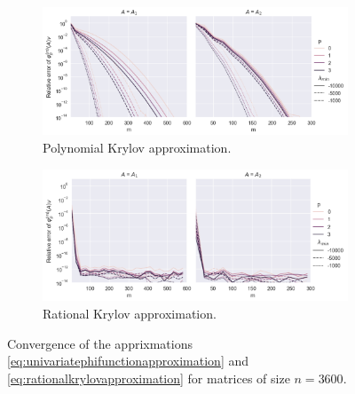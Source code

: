 \begin{figure}[h!]
    \centering
    \begin{subfigure}[b]{.9\textwidth}
        \includegraphics[width=\textwidth]{img/krylovapproximation/cnvg_ps_PA_3600.png}
        \caption{Polynomial Krylov approximation.}
        \label{fig:polynomialkrylovapproximationevaluation}
    \end{subfigure}
    \vfill
    \begin{subfigure}[b]{.9\textwidth}
        \includegraphics[width=\textwidth]{img/krylovapproximation/cnvg_ps_RA_3600.png}
        \caption{Rational Krylov approximation.}
        \label{fig:rationalkrylovapproximationevaluation}
    \end{subfigure}
    \caption{Convergence of the apprixmations \eqref{eq:univariatephifunctionapproximation} and \eqref{eq:rationalkrylovapproximation} for matrices of size $n=3600$.}
    \label{fig:krylovapproximationevaluation}
\end{figure}


